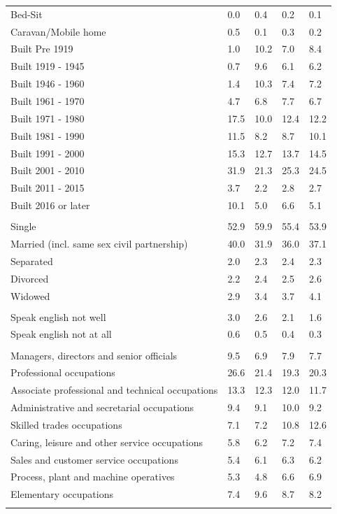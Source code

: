 \documentclass{article}
\begin{document}
\begin{table}[h]
\begin{tabular}{KTTTT}
Bed-Sit & 0.0& 0.4& 0.2& 0.1\\
Caravan/Mobile home & 0.5& 0.1& 0.3& 0.2\\
    \hline
Built Pre 1919 &  1.0& 10.2&  7.0&  8.4\\
Built 1919 - 1945 & 0.7& 9.6& 6.1& 6.2\\
Built  1946 - 1960 &  1.4& 10.3&  7.4&  7.2\\
Built  1961 - 1970 & 4.7& 6.8& 7.7& 6.7\\
Built  1971 - 1980 & 17.5& 10.0& 12.4& 12.2\\
Built  1981 - 1990 & 11.5&  8.2&  8.7& 10.1\\
Built  1991 - 2000 & 15.3& 12.7& 13.7& 14.5\\
Built  2001 - 2010 & 31.9& 21.3& 25.3& 24.5\\
Built  2011 - 2015 & 3.7& 2.2& 2.8& 2.7\\
Built  2016 or later & 10.1&  5.0&  6.6&  5.1\\
\hline
    \\
    \hline
Single & 52.9& 59.9& 55.4& 53.9\\
Married (incl. same sex civil partnership) & 40.0& 31.9& 36.0& 37.1\\
Separated  & 2.0& 2.3& 2.4& 2.3\\
Divorced  & 2.2& 2.4& 2.5& 2.6\\
Widowed & 2.9& 3.4& 3.7& 4.1\\
\hline
    \\ 
    \hline
Speak english not well & 3.0& 2.6& 2.1& 1.6\\
Speak english not at all & 0.6& 0.5& 0.4& 0.3\\
\hline
    \\
    \hline
Managers, directors and senior officials & 9.5& 6.9& 7.9& 7.7\\
Professional occupations & 26.6& 21.4& 19.3& 20.3\\
Associate professional and technical occupations & 13.3& 12.3& 12.0& 11.7\\
Administrative and secretarial occupations &  9.4&  9.1& 10.0&  9.2\\
Skilled trades occupations &  7.1&  7.2& 10.8& 12.6\\
Caring, leisure and other service occupations & 5.8& 6.2& 7.2& 7.4\\
Sales and customer service occupations & 5.4& 6.1& 6.3& 6.2\\
Process, plant and machine operatives & 5.3& 4.8& 6.6& 6.9\\
Elementary occupations & 7.4& 9.6& 8.7& 8.2\\
\hline
\end{tabular}
\end{table}
\end{document}
